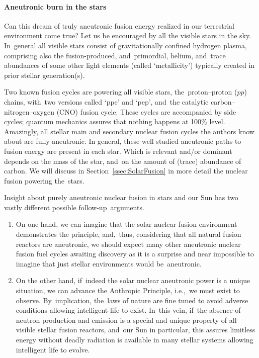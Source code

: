\documentclass[particles,article,accept,pdftex,moreauthors]{Definitions/mdpi}
\begin{document}
\vspace{-6pt}\paragraph*{\bf Aneutronic burn in the stars}
Can this dream of truly aneutronic fusion energy realized in our terrestrial environment come true? Let us be encouraged by all the visible stars in the sky. In~general all visible stars consist of gravitationally confined hydrogen plasma, comprising also the fusion-produced, and~primordial, helium, and~trace abundances of some other light elements (called `metallicity') typically created in prior stellar generation(s). 

Two known fusion cycles are powering all visible stars, the~proton--proton ($pp$) chains, with~two versions called `ppe' and `pep', and~the catalytic carbon--nitrogen--oxygen (CNO) fusion cycle. These cycles are accompanied by side cycles; quantum mechanics assures that nothing happens at 100\% level. Amazingly, all stellar main and secondary nuclear fusion cycles the authors know about are fully aneutronic. In general, these well studied aneutronic paths to fusion energy are present in each star. Which is relevant and/or dominant depends on the mass of the star, and~on the amount of (trace) abundance of carbon. We will discuss in Section~\ref{ssec:SolarFusion} in more detail the nuclear fusion powering the~stars.

Insight about purely aneutronic nuclear fusion in stars and our Sun has two vastly different possible follow-up~arguments.
\begin{enumerate}
\item On one hand, we can imagine that the solar nuclear fusion environment demonstrates the principle, and,~thus, considering that all natural fusion reactors are aneutronic, we should expect many other aneutronic nuclear fusion fuel cycles awaiting discovery as it is a surprise and near impossible to imagine that just stellar environments would be~aneutronic.
\item On the other hand, if~indeed the solar nuclear aneutronic power is a unique situation, we can advance the Anthropic Principle, i.e.,~we must exist to observe. By~implication, the~laws of nature are fine tuned to avoid adverse conditions allowing intelligent life to exist. In~this vein, if~the absence of neutron production and emission is a special and unique property of all visible stellar fusion reactors, and~our Sun in particular, this assures limitless energy without deadly radiation is available in many stellar systems allowing intelligent life to evolve.
\end{enumerate}
\end{document}
